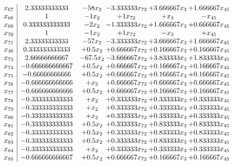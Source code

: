 \documentclass[11pt]{article}
\begin{document}
\[\begin{array}{c| c c@{\hskip 2pt} c@{\hskip 2pt} c@{\hskip 2pt} c@{\hskip 2pt} }
 x_{67}   &  2.33333333333 & -58 x_{2} & -3.333333 x_{72} & + 3.666667 x_{3} & + 1.666667 x_{45}\\
 x_{68}   &  1 & -1 x_{2} & + 1 x_{72} & +  x_{3} & - x_{45}\\
 x_{69}   &  0.333333333333 & -2 x_{2} & -1.333333 x_{72} & + 1.666667 x_{3} & + 0.666667 x_{45}\\
 x_{70}   &  1 & -1 x_{2} & + 1 x_{72} & - x_{3} & +  x_{45}\\
 x_{71}   &  2.33333333333 & -57 x_{2} & -3.333333 x_{72} & + 3.666667 x_{3} & + 1.666667 x_{45}\\
 x_{46}   &  0.333333333333 & + 0.5 x_{2} & + 0.666667 x_{72} & + 0.166667 x_{3} & + 0.166667 x_{45}\\
 x_{73}   &  2.66666666667 & -67.5 x_{2} & -3.666667 x_{72} & + 3.833333 x_{3} & + 1.833333 x_{45}\\
 x_{74}   &  -0.666666666667 & + 0.5 x_{2} & + 0.666667 x_{72} & + 0.166667 x_{3} & + 0.166667 x_{45}\\
 x_{75}   &  -0.66666666666 & + 0.5 x_{2} & + 0.666667 x_{72} & + 0.166667 x_{3} & + 0.166667 x_{45}\\
 x_{76}   &  -0.666666666666 & +  x_{2} & + 0.666667 x_{72} & + 0.666667 x_{3} & + 0.666667 x_{45}\\
 x_{77}   &  -0.666666666666 & + 0.5 x_{2} & + 0.666667 x_{72} & + 0.166667 x_{3} & + 0.166667 x_{45}\\
 x_{78}   &  -0.333333333333 & +  x_{2} & + 0.333333 x_{72} & + 0.333333 x_{3} & + 0.333333 x_{45}\\
 x_{79}   &  -0.333333333333 & +  x_{2} & + 0.333333 x_{72} & + 0.333333 x_{3} & + 0.333333 x_{45}\\
 x_{80}   &  -0.333333333333 & +  x_{2} & + 0.333333 x_{72} & + 0.333333 x_{3} & + 0.333333 x_{45}\\
 x_{81}   &  -0.333333333333 & + 0.5 x_{2} & + 0.333333 x_{72} & + 0.833333 x_{3} & + 0.833333 x_{45}\\
 x_{82}   &  -0.333333333333 & + 0.5 x_{2} & + 0.333333 x_{72} & + 0.833333 x_{3} & + 0.833333 x_{45}\\
 x_{83}   &  -0.333333333333 & + 0.5 x_{2} & + 0.333333 x_{72} & + 0.833333 x_{3} & + 0.833333 x_{45}\\
 x_{84}   &  -0.333333333333 & +  x_{2} & + 0.333333 x_{72} & + 0.333333 x_{3} & + 0.333333 x_{45}\\
 x_{85}   &  -0.666666666667 & + 0.5 x_{2} & + 0.666667 x_{72} & + 0.166667 x_{3} & + 0.166667 x_{45}\\

\end{array}\]
\end{document}
